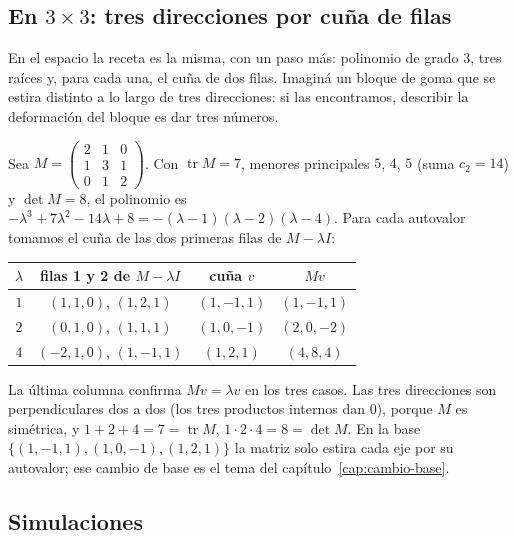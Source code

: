 \subsection{En \texorpdfstring{$3\times3$}{3x3}: tres direcciones por cuña de filas}\label{sec:autovec-3x3}

En el espacio la receta es la misma, con un paso más: polinomio de grado \(3\), tres raíces y,
para cada una, el cuña de dos filas. Imaginá un bloque de goma que se estira distinto a lo largo
de tres direcciones: si las encontramos, describir la deformación del bloque es dar tres
números.

\begin{ejemplo}\label{ej:autovec-3x3}
Sea \(M=\left(\begin{smallmatrix}2&1&0\\1&3&1\\0&1&2\end{smallmatrix}\right)\). Con
\(\operatorname{tr}M=7\), menores principales \(5\), \(4\), \(5\) (suma \(c_2=14\)) y
\(\det M=8\), el polinomio es
\(-\lambda^3+7\lambda^2-14\lambda+8=-(\lambda-1)(\lambda-2)(\lambda-4)\). Para cada
autovalor tomamos el cuña de las dos primeras filas de \(M-\lambda I\):
\begin{center}
\begin{tabular}{cccc}
\toprule
\(\lambda\) & filas 1 y 2 de \(M-\lambda I\) & cuña \(v\) & \(Mv\)\\
\midrule
\(1\) & \((1,1,0)\), \((1,2,1)\) & \((1,-1,1)\) & \((1,-1,1)\)\\
\(2\) & \((0,1,0)\), \((1,1,1)\) & \((1,0,-1)\) & \((2,0,-2)\)\\
\(4\) & \((-2,1,0)\), \((1,-1,1)\) & \((1,2,1)\) & \((4,8,4)\)\\
\bottomrule
\end{tabular}
\end{center}
La última columna confirma \(Mv=\lambda v\) en los tres casos. Las tres direcciones son
perpendiculares dos a dos (los tres productos internos dan \(0\)), porque \(M\) es simétrica,
y \(1+2+4=7=\operatorname{tr}M\), \(1\cdot2\cdot4=8=\det M\). En la base
\(\{(1,-1,1),(1,0,-1),(1,2,1)\}\) la matriz solo estira cada eje por su autovalor; ese cambio
de base es el tema del capítulo~\ref{cap:cambio-base}.
\end{ejemplo}

\subsection{Simulaciones}


